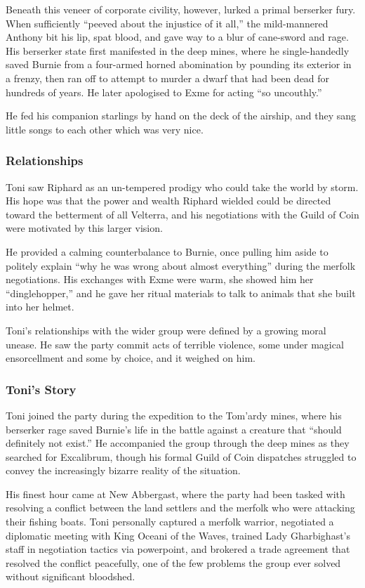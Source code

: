 Beneath this veneer of corporate civility, however, lurked a primal berserker fury.  When sufficiently ``peeved about the injustice of it all,'' the mild-mannered Anthony bit his lip, spat blood, and gave way to a blur of cane-sword and rage.  His berserker state first manifested in the deep mines, where he single-handedly saved Burnie from a four-armed horned abomination by pounding its exterior in a frenzy, then ran off to attempt to murder a dwarf that had been dead for hundreds of years.  He later apologised to Exme for acting ``so uncouthly.''

He fed his companion starlings by hand on the deck of the airship, and they sang little songs to each other which was very nice.

\subsubsection{Relationships}

Toni saw Riphard as an un-tempered prodigy who could take the world by storm.  His hope was that the power and wealth Riphard wielded could be directed toward the betterment of all Velterra, and his negotiations with the Guild of Coin were motivated by this larger vision.

He provided a calming counterbalance to Burnie, once pulling him aside to politely explain ``why he was wrong about almost everything'' during the merfolk negotiations.  His exchanges with Exme were warm, she showed him her ``dinglehopper,'' and he gave her ritual materials to talk to animals that she built into her helmet.

Toni's relationships with the wider group were defined by a growing moral unease.  He saw the party commit acts of terrible violence, some under magical ensorcellment and some by choice, and it weighed on him.

\subsubsection{Toni's Story}

Toni joined the party during the expedition to the Tom'ardy mines, where his berserker rage saved Burnie's life in the battle against a creature that ``should definitely not exist.''  He accompanied the group through the deep mines as they searched for Excalibrum, though his formal Guild of Coin dispatches struggled to convey the increasingly bizarre reality of the situation.

His finest hour came at New Abbergast, where the party had been tasked with resolving a conflict between the land settlers and the merfolk who were attacking their fishing boats.  Toni personally captured a merfolk warrior, negotiated a diplomatic meeting with King Oceani of the Waves, trained Lady Gharbighast's staff in negotiation tactics via powerpoint, and brokered a trade agreement that resolved the conflict peacefully, one of the few problems the group ever solved without significant bloodshed.

